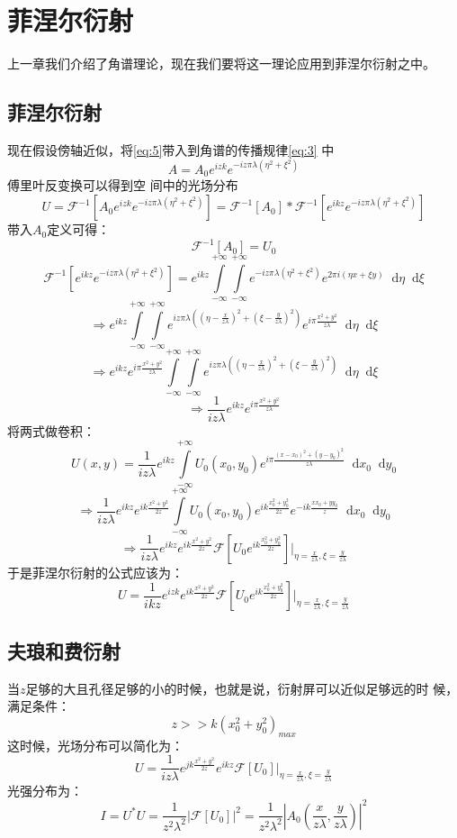 \documentclass{article}
\newcommand*{\dif}{\mathop{}\!\mathrm{d}}
\begin{document}
\section{菲涅尔衍射}
上一章我们介绍了角谱理论，现在我们要将这一理论应用到菲涅尔衍射之中。
\subsection{菲涅尔衍射}

现在假设傍轴近似，将\ref{eq:5}带入到角谱的传播规律\ref{eq:3}
中\[A=A_0e^{izk}e^{-iz\pi\lambda(\eta^2+\xi^2)}\]傅里叶反变换可以得到空
间中的光场分布
\[U=\mathscr{F}^{-1}[A_0e^{izk}e^{-iz\pi\lambda(\eta^{2}+\xi^2)}]=\mathscr{F}^{-1}[A_0]*\mathscr{F}^{-1}[e^{ikz}e^{-iz\pi\lambda(\eta^2+\xi^2)}]\]
带入$A_0$定义可得：
\[\mathscr{F}^{-1}[A_0]=U_0\]
\[
  \mathscr{F}^{-1}[e^{ikz}e^{-iz\pi\lambda(\eta^2+\xi^2)}]=e^{ikz}\int\limits_{-\infty}^{+\infty}\int\limits_{-\infty}^{+\infty}e^{-iz\pi\lambda(\eta^2+\xi^2)}e^{2\pi
    i(\eta x+\xi y)}\dif\eta\dif\xi\]
\[\Rightarrow
  e^{ikz}\int\limits_{-\infty}^{+\infty}\int\limits_{-\infty}^{+\infty}e^{iz\pi\lambda((\eta-\frac{x}{z\lambda})^2+(\xi-\frac{y}{z\lambda})^2)}e^{i\pi
    \frac{x^2+y^2}{z\lambda}}\dif\eta\dif\xi\]
\[\Rightarrow e^{ikz}e^{i\pi
    \frac{x^2+y^2}{z\lambda}}\int\limits_{-\infty}^{+\infty}\int\limits_{-\infty}^{+\infty}e^{iz\pi\lambda((\eta-\frac{x}{z\lambda})^2+(\xi-\frac{y}{z\lambda})^2)}\dif\eta\dif\xi\]
\[\Rightarrow \frac{1}{iz\lambda}e^{ikz}e^{i\pi \frac{x^2+y^2}{z\lambda}}\]
将两式做卷积：
\[U(x,y)=\frac{1}{iz\lambda}e^{ikz}\int\limits_{-\infty}^{+\infty}U_0(x_0,y_0)e^{i\pi
    \frac{(x-x_0)^2+(y-y_0)^2}{z\lambda}}\dif x_0\dif y_0\]
\[\Rightarrow \frac{1}{iz\lambda}e^{ikz}e^{ik
    \frac{x^2+y^2}{2z}}\int\limits_{-\infty}^{+\infty}U_0(x_0,y_0)e^{ik
    \frac{x_0^2+y_0^2}{2z}}e^{-ik \frac{xx_0+yy_0}{z}}\dif x_0\dif
  y_0\]
\[\Rightarrow \frac{1}{iz\lambda}e^{ikz}e^{ik
    \frac{x^2+y^2}{2z}}\mathscr{F}[U_0e^{ik
    \frac{x_0^2+y_0^2}{2z}}]|_{\eta=\frac{x}{z\lambda},\xi=\frac{y}{z\lambda}}\]
于是菲涅尔衍射的公式应该为：
\begin{equation}
  \label{eq:6}
  U=\frac{1}{ikz}e^{izk}e^{ik \frac{x^2+y^2}{2z}}\mathscr{F}[U_0e^{ik \frac{x_0^2+y_0^2}{2z}}]|_{\eta=\frac{x}{z\lambda},\xi=\frac{y}{z\lambda}}
\end{equation}
\subsection{夫琅和费衍射}
当$z$足够的大且孔径足够的小的时候，也就是说，衍射屏可以近似足够远的时
候，满足条件：
\[z>>k(x_0^2+y_0^2)_{max}\]
这时候，光场分布可以简化为：
\[U=\frac{1}{iz\lambda}e^{jk
    \frac{x^2+y^2}{2z}}e^{ikz}\mathscr{F}[U_0]|_{\eta=\frac{x}{z\lambda},\xi=\frac{y}{z\lambda}}\]
光强分布为：
\begin{equation}
  \label{eq:7}
  I=U^{*}U=\frac{1}{z^2\lambda^2}|\mathscr{F}[U_0]|^2=\frac{1}{z^2\lambda^2}|A_0(\frac{x}{z\lambda},\frac{y}{z\lambda})|^2
\end{equation}
\end{document}
